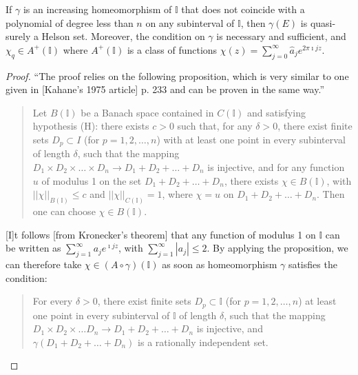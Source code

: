\begin{proposition}
  \label{prop:Helson}
  If $\gamma$ is an increasing homeomorphism of $\mathbb{I}$ that does not coincide with a polynomial of degree less than $n$ on any subinterval of $\mathbb{I}$, then $\gamma\left(E\right)$ is quasi-surely a Helson set. Moreover, the condition on $\gamma$ is necessary and sufficient, and $\chi_q \in A^+\left(\mathbb{I}\right)$ where $A^+\left(\mathbb{I}\right)$ is a class of functions $\chi\left(z\right) = \sum\limits_{j = 0}^\infty \widehat{a}_j e^{2\pi \imath j z}$.
\end{proposition}
\begin{proof}
   ``The proof relies on the following proposition, which is very similar to one given in [Kahane's 1975 article] p. 233 and can be proven in the same way.'' 
   \begin{quote}
    Let $B\left(\mathbb{I}\right)$ be a Banach space contained in $C\left(\mathbb{I}\right)$ and satisfying hypothesis (H): there exists $c > 0$ such that, for any $\delta > 0$, there exist finite sets $D_p\subset I$ (for $p = 1, 2, \ldots, n$) with at least one point in every subinterval of length $\delta$, such that the mapping $D_1\times D_2\times \dots \times D_n \to D_1 + D_2 + \ldots + D_n$ is injective, and for any function $u$ of modulus 1 on the set $D_1 + D_2 + \ldots + D_n$, there exists $\chi\in B\left(\mathbb{I}\right)$, with $\left|\left|\chi\right|\right|_{B\left(\mathbb{I}\right)} \leq c$ and $\left|\left|\chi\right|\right|_{C\left(\mathbb{I}\right)} = 1$, where $\chi = u$ on $D_1 + D_2 + \ldots + D_n$. Then one can choose $\chi \in B\left(\mathbb{I}\right)$.
    \end{quote}
    [I]t follows [from Kronecker's theorem] that any function of modulus 1 on $\mathbb{I}$ can be written as $\sum\limits_{j = 1}^\infty a_j e^{\imath j z}$, with $\sum\limits_{j = 1}^\infty \left|a_j\right| \leq 2$. By applying the proposition, we can therefore take $\chi \in (A \circ \gamma)\left(\mathbb{I}\right)$ as soon as homeomorphism $\gamma$ satisfies the condition:
    \begin{quote}
    For every $\delta > 0$, there exist finite sets $D_p \subset \mathbb{I}$ (for $p = 1, 2, \ldots, n$) at least one point in every subinterval of $\mathbb{I}$ of length $\delta$, such that the mapping $D_1 \times D_2\times \ldots D_n \to D_1 + D_2 + \ldots + D_n$ is injective, and $\gamma(D_1 + D_2 + \ldots + D_n)$ is a rationally independent set.
   \end{quote}
\end{proof}

